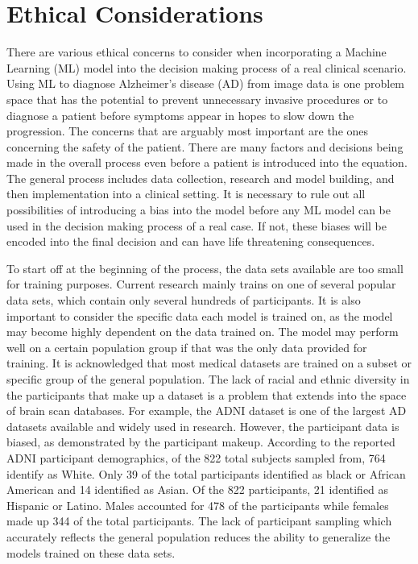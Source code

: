 \documentclass[10pt,twocolumn]{article}
\begin{document}
\section{Ethical Considerations}
There are various ethical concerns to consider when incorporating a Machine Learning (ML) model into the decision making process of a real clinical scenario. Using ML to diagnose Alzheimer’s disease (AD) from image data is one problem space that has the potential to prevent unnecessary invasive procedures or to diagnose a patient before symptoms appear in hopes to slow down the progression. The concerns that are arguably most important are the ones concerning the safety of the patient. There are many factors and decisions being made in the overall process even before a patient is introduced into the equation. The general process includes data collection, research and model building, and then implementation into a clinical setting. It is necessary to rule out all possibilities of introducing a bias into the model before any ML model can be used in the decision making process of a real case. If not, these biases will be encoded into the final decision and can have life threatening consequences.

To start off at the beginning of the process, the data sets available are too small for training purposes. Current research mainly trains on one of several popular data sets, which contain only several hundreds of participants. It is also important to consider the specific data each model is trained on, as the model may become highly dependent on the data trained on. The model may perform well on a certain population group if that was the only data provided for training. It is acknowledged that most medical datasets are trained on a subset or specific group of the general population. The lack of racial and ethnic diversity in the participants that make up a dataset is a problem that extends into the space of brain scan databases. For example, the ADNI dataset is one of the largest AD datasets available and widely used in research. However, the participant data is biased, as demonstrated by the participant makeup. According to the reported ADNI participant demographics, of the 822 total subjects sampled from, 764 identify as White. Only 39 of the total participants identified as black or African American and 14 identified as Asian. Of the 822 participants, 21 identified as Hispanic or Latino. Males accounted for 478 of the participants while females made up 344 of the total participants. The lack of participant sampling which accurately reflects the general population reduces the ability to generalize the models trained on these data sets. 
\end{document}
